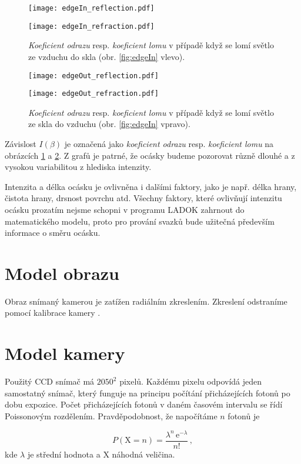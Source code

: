 \begin{figure}[htps]
\centering
\begin{minipage}[c]{0.48\textwidth}
\texttt{[image: edgeIn\_reflection.pdf]}
\end{minipage}
\begin{minipage}[c]{0.48\textwidth}
\texttt{[image: edgeIn\_refraction.pdf]}
\end{minipage}
\caption{\textit{Koeficient odrazu} resp. \textit{koeficient lomu} v případě když se lomí světlo ze vzduchu do skla (obr. \ref{fig:edgeIn} vlevo).}
\label{fig:edgeInGraf}
\end{figure}

\begin{figure}[htps]
\centering
\begin{minipage}[c]{0.48\textwidth}
\texttt{[image: edgeOut\_reflection.pdf]}
\end{minipage}
\begin{minipage}[c]{0.48\textwidth}
\texttt{[image: edgeOut\_refraction.pdf]}
\end{minipage}
\caption{\textit{Koeficient odrazu} resp. \textit{koeficient lomu} v případě když se lomí světlo ze skla do vzduchu (obr. \ref{fig:edgeIn} vpravo).}
\label{fig:edgeOutGraf}
\end{figure}

Závislost $I(\beta)$ je označená jako \textit{koeficient odrazu} resp. \textit{koeficient lomu} na obrázcích \ref{fig:edgeInGraf} a \ref{fig:edgeOutGraf}. Z grafů je patrné, že ocásky budeme pozorovat různě dlouhé a z vysokou variabilitou z hlediska intenzity. 
	  
 Intenzita a délka ocásku je ovlivněna i dalšími faktory, jako je např. délka hrany, čistota hrany, drsnost povrchu atd. Všechny faktory, které ovlivňují intenzitu ocásku prozatím nejsme schopni v programu LADOK zahrnout do matematického modelu, proto pro prování svazků bude užitečná především informace o směru ocásku. 
 
 

\section{Model obrazu}

Obraz snímaný kamerou je zatížen radiálním zkreslením. Zkreslení odstraníme pomocí kalibrace kamery \cite{Drapela}. 


\section{Model kamery}
\label{sec:poisson}
 Použitý CCD snímač má $2050^2$ pixelů. Každému pixelu odpovídá jeden samostatný snímač, který funguje na principu počítání přicházejících fotonů po dobu expozice. Počet přicházejících fotonů v daném časovém intervalu se řídí Poissonovým rozdělením. Pravděpodobnost, že napočítáme $n$ fotonů je 
 
 \begin{equation}
    P(\mathrm{X} = n)=\frac{\lambda ^{n}\,\mathrm{e}^{-\lambda}}{n!}\,,
 \end{equation}
 kde $\lambda$ je střední hodnota a $\mathrm{X}$ náhodná veličina.




\newpage







